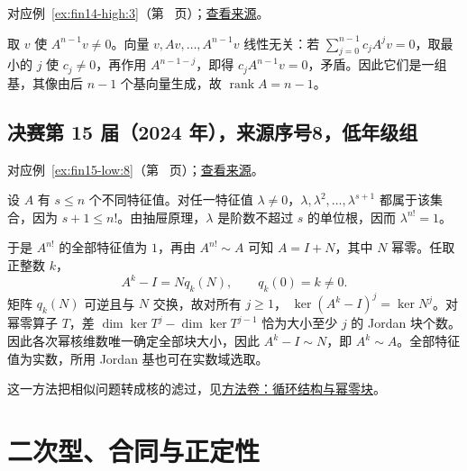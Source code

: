 \documentclass[UTF8,12pt,a4paper,fontset=fandol]{ctexart}
\begin{document}
对应例~\ref{ex:fin14-high:3}（第~\pageref{ex:fin14-high:3} 页）；\href{https://github.com/lzxcr/cmc-mathematics/blob/64916fa1fdbc3e444a652eca204d5669058ee321/src/problems/finals/14/03.md}{查看来源}。

\begin{solve}

取 $v$ 使 $A^{n-1}v\ne0$。向量 $v,Av,\dots,A^{n-1}v$ 线性无关：若 $\sum_{j=0}^{n-1}c_jA^jv=0$，取最小的 $j$ 使 $c_j\ne0$，再作用 $A^{n-1-j}$，即得 $c_jA^{n-1}v=0$，矛盾。因此它们是一组基，其像由后 $n-1$ 个基向量生成，故 $\boxed{\operatorname{rank}A=n-1}$。

\end{solve}

\subsection{决赛第 15 届（2024 年），来源序号8，低年级组}\label{ans:fin15-low:8}\label{pr:fin15-low:8}

对应例~\ref{ex:fin15-low:8}（第~\pageref{ex:fin15-low:8} 页）；\href{https://github.com/lzxcr/cmc-mathematics/blob/64916fa1fdbc3e444a652eca204d5669058ee321/src/problems/finals/15/08.md}{查看来源}。

\begin{solve}

设 $A$ 有 $s\le n$ 个不同特征值。对任一特征值 $\lambda\ne0$，$\lambda,\lambda^2,\dots,\lambda^{s+1}$ 都属于该集合，因为 $s+1\le n!$。由抽屉原理，$\lambda$ 是阶数不超过 $s$ 的单位根，因而 $\lambda^{n!}=1$。

于是 $A^{n!}$ 的全部特征值为 $1$，再由 $A^{n!}\sim A$ 可知 $A=I+N$，其中 $N$ 幂零。任取正整数 $k$，
\[
A^k-I=Nq_k(N),\qquad q_k(0)=k\ne0.
\]
矩阵 $q_k(N)$ 可逆且与 $N$ 交换，故对所有 $j\ge1$，
$\ker(A^k-I)^j=\ker N^j$。对幂零算子 $T$，差 $\dim\ker T^j-\dim\ker T^{j-1}$ 恰为大小至少 $j$ 的 Jordan 块个数。因此各次幂核维数唯一确定全部块大小，因此 $A^k-I\sim N$，即 $A^k\sim A$。全部特征值为实数，所用 Jordan 基也可在实数域选取。

这一方法把相似问题转成核的滤过，见\hyperref[app:linear-cyclic]{方法卷：循环结构与幂零块}。

\end{solve}

\section{二次型、合同与正定性}

\label{sec:solutions-7}
\end{document}
